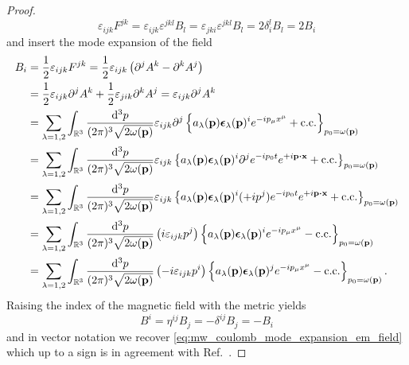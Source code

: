 \begin{proof}
	\begin{equation*}
		\varepsilon_{ijk}
		F^{jk}
		=
		\varepsilon_{ijk}
		\varepsilon^{jkl}
		B_l
		=
		\varepsilon_{jki}
		\varepsilon^{jkl}
		B_l
		=
		2
		\delta_i^l
		B_l
		=
		2B_i
	\end{equation*}
	and insert the mode expansion of the field
	\begin{equation*}
		\begin{split}
			B_i
			&=
			\frac{1}{2}
			\varepsilon_{ijk}
			F^{jk}
			=
			\frac{1}{2}
			\varepsilon_{ijk}
			\left(
				\partial^j
				A^k
				-
				\partial^k
				A^j
			\right)
			\\
			&=
			\frac{1}{2}
			\varepsilon_{ijk}
			\partial^j
			A^k
			+
			\frac{1}{2}
			\varepsilon_{jik}
			\partial^k
			A^j
			=
			\varepsilon_{ijk}
			\partial^j
			A^k
			\\
			&=
			\sum_{\lambda=1,2}
			\int_{\mathbb{R}^3}\frac{\dd[3]{p}}{(2\pi)^3\sqrt{2\omega(\vb{p})}}
			\varepsilon_{ijk}
			\partial^j
			\left\{
				a_\lambda(\vb{p})
				\boldsymbol{\epsilon}_\lambda(\vb{p})^i
				e^{-ip_\mu x^\mu}
				+
				\text{c.c.}
			\right\}_{p_0=\omega(\vb{p})}
			\\
			&=
			\sum_{\lambda=1,2}
			\int_{\mathbb{R}^3}\frac{\dd[3]{p}}{(2\pi)^3\sqrt{2\omega(\vb{p})}}
			\varepsilon_{ijk}
			\left\{
				a_\lambda(\vb{p})
				\boldsymbol{\epsilon}_\lambda(\vb{p})^i
				\partial^j
				e^{-ip_0t}
				e^{+i\vb{p}\vdot\vb{x}}
				+
				\text{c.c.}
			\right\}_{p_0=\omega(\vb{p})}
			\\
			&=
			\sum_{\lambda=1,2}
			\int_{\mathbb{R}^3}\frac{\dd[3]{p}}{(2\pi)^3\sqrt{2\omega(\vb{p})}}
			\varepsilon_{ijk}
			\left\{
				a_\lambda(\vb{p})
				\boldsymbol{\epsilon}_\lambda(\vb{p})^i
				(+ip^j)
				e^{-ip_0t}
				e^{+i\vb{p}\vdot\vb{x}}
				+
				\text{c.c.}
			\right\}_{p_0=\omega(\vb{p})}
			\\
			&=
			\sum_{\lambda=1,2}
			\int_{\mathbb{R}^3}\frac{\dd[3]{p}}{(2\pi)^3\sqrt{2\omega(\vb{p})}}
			\left(
				i
				\varepsilon_{ijk}
				p^j
			\right)
			\left\{
				a_\lambda(\vb{p})
				\boldsymbol{\epsilon}_\lambda(\vb{p})^i
				e^{-ip_\mu x^\mu}
				-
				\text{c.c.}
			\right\}_{p_0=\omega(\vb{p})}
			\\
			&=
			\sum_{\lambda=1,2}
			\int_{\mathbb{R}^3}\frac{\dd[3]{p}}{(2\pi)^3\sqrt{2\omega(\vb{p})}}
			\left(
				-i
				\varepsilon_{ijk}
				p^i
			\right)
			\left\{
				a_\lambda(\vb{p})
				\boldsymbol{\epsilon}_\lambda(\vb{p})^j
				e^{-ip_\mu x^\mu}
				-
				\text{c.c.}
			\right\}_{p_0=\omega(\vb{p})}
			.
		\end{split}
	\end{equation*}
	Raising the index of the magnetic field with the metric yields
	\begin{equation*}
		B^i
		=
		\eta^{ij}
		B_j
		=
		-
		\delta^{ij}
		B_j
		=
		-
		B_i
	\end{equation*}
	and in vector notation we recover \cref{eq:mw_coulomb_mode_expansion_em_field} which up to a sign is in agreement with Ref.~\cite[p.~198]{Greiner2013}.
\end{proof}

